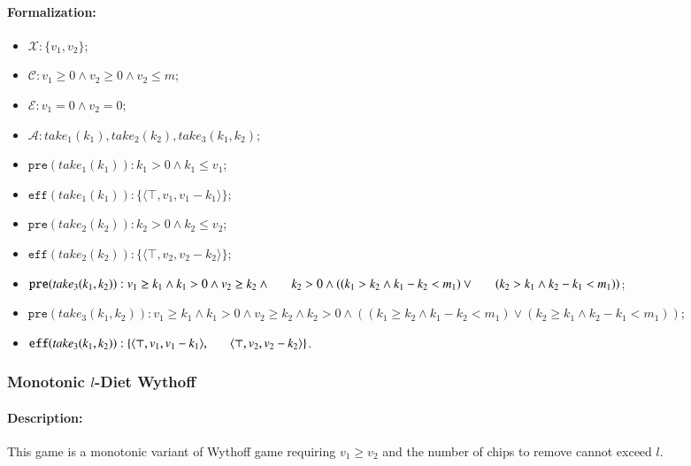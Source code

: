 \documentclass[review]{elsarticle}
\newcommand{\set}[1]{\{ #1 \}}
\newcommand{\tuple}[1]{\langle {#1} \rangle}
\newcommand{\true}{\top}
\newcommand{\statevar}{\mathcal{X}}
\newcommand{\act}{\mathcal{A}}
\newcommand{\constraint}{\mathcal{C}}
\newcommand{\estate}{\mathcal{E}}
\newcommand{\pre}{\mathtt{pre}}
\newcommand{\eff}{\mathtt{eff}}
\begin{document}
\paragraph{Formalization:}
\begin{itemize}
	\item $\statevar: \set{v_1, v_2}$;
	\item $\constraint: v_1 \ge 0 \wedge v_2 \ge 0 \wedge v_2 \le m$;
	\item $\estate: v_1=0 \wedge v_2 = 0$;
	\item $\act:take_1(k_1), take_2(k_2), take_3(k_1,k_2)$;
	\item $\pre(take_1(k_1)) :  k_1 > 0 \wedge k_1 \le v_1$;
	\item $\eff(take_1(k_1)) : \set{\tuple{\true, v_1, v_1-k_1}}$;
	\item $\pre(take_2(k_2)) :  k_2 > 0 \wedge k_2 \le v_2$;
	\item $\eff(take_2(k_2)) : \set{\tuple{\true, v_2, v_2-k_2}}$;
	\item $\pre(take_3(k_1, k_2)) : v_1 \ge k_1 \wedge  k_1 > 0 \wedge v_2 \ge k_2 \wedge \\ \hspace*{6mm}
	k_2 > 0 \wedge((k_1 > k_2 \wedge k_1 - k_2 < m_1)\vee \\ \hspace*{6mm}
	(k_2 > k_1 \wedge k_2 - k_1 < m_1))$;
	\item {\color{red}$\pre(take_3(k_1, k_2)) : v_1 \ge k_1 \wedge k_1 > 0 \wedge v_2 \ge k_2 \wedge k_2 > 0 \wedge ((k_1 \ge k_2 \wedge k_1 - k_2 < m_1) \vee (k_2 \ge k_1 \wedge k_2 - k_1 < m_1))$;}
	\item $\eff(take_3(k_1, k_2)) : \set{\tuple{\true, v_1, v_1 -k_1},\\ \hspace*{6mm}
		\tuple{\true, v_2, v_2 - k_2}}$.
\end{itemize}



\subsubsection{Monotonic $l$-Diet Wythoff \protect\cite{AhnCCEFGGKMPS2017}} 

\paragraph{Description:}  
This game is a monotonic variant of Wythoff game requiring $v_1 \ge v_2$ and the number of chips to remove cannot exceed $l$.
\end{document}
